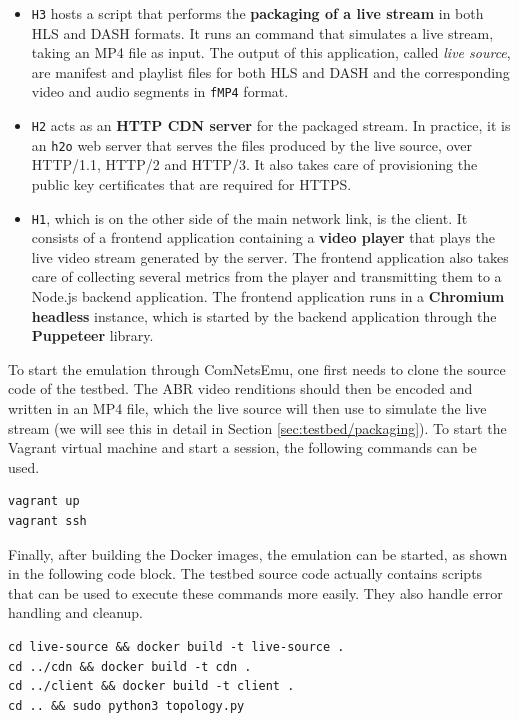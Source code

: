 \begin{itemize}
    \item \texttt{H3} hosts a script that performs the \textbf{packaging of a live stream} in both HLS and DASH formats. It runs an \ffmpeg{} command that simulates a live stream, taking an MP4 file as input. The output of this application, called \textit{live source}, are manifest and playlist files for both HLS and DASH and the corresponding video and audio segments in \texttt{fMP4} format.
    \item \texttt{H2} acts as an \textbf{HTTP CDN server} for the packaged stream. In practice, it is an \texttt{h2o} web server that serves the files produced by the live source, over HTTP/1.1, HTTP/2 and HTTP/3. It also takes care of provisioning the public key certificates that are required for HTTPS.
    \item \texttt{H1}, which is on the other side of the main network link, is the client. It consists of a frontend application containing a \textbf{video player} that plays the live video stream generated by the server. The frontend application also takes care of collecting several metrics from the player and transmitting them to a Node.js backend application. The frontend application runs in a \textbf{Chromium headless} instance, which is started by the backend application through the \textbf{Puppeteer} library.
\end{itemize}

To start the emulation through ComNetsEmu, one first needs to clone the source code of the testbed. The ABR video renditions should then be encoded and written in an MP4 file, which the live source will then use to simulate the live stream (we will see this in detail in Section \ref{sec:testbed/packaging}). To start the Vagrant virtual machine and start a session, the following commands can be used.

\begin{verbatim}
vagrant up
vagrant ssh
\end{verbatim}

Finally, after building the Docker images, the emulation can be started, as shown in the following code block. The testbed source code actually contains scripts that can be used to execute these commands more easily. They also handle error handling and cleanup.

\begin{verbatim}
cd live-source && docker build -t live-source .
cd ../cdn && docker build -t cdn .
cd ../client && docker build -t client .
cd .. && sudo python3 topology.py
\end{verbatim}

